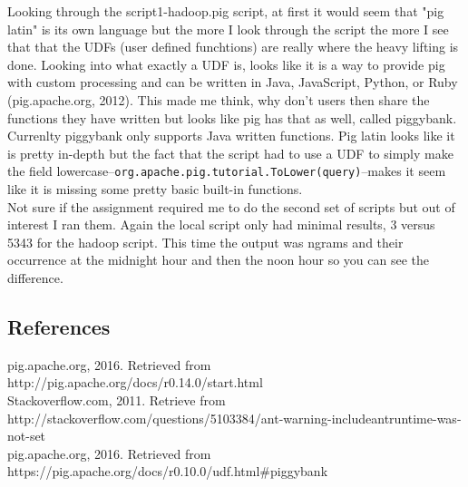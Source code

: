 \documentclass[10pt]{article}
\begin{document}
\indent Looking through the script1-hadoop.pig script, at first it would seem that "pig latin" is its own language but the more I look through the script the more I see that that the UDFs (user defined funchtions) are really where the heavy lifting is done. Looking into what exactly a UDF is, looks like it is a way to provide pig with custom processing and can be written in Java, JavaScript, Python, or Ruby (pig.apache.org, 2012). This made me think, why don't users then share the functions they have written but looks like pig has that as well, called piggybank. Currenlty piggybank only supports Java written functions. Pig latin looks like it is pretty in-depth but the fact that the script had to use a UDF to simply make the field lowercase--\verb|org.apache.pig.tutorial.ToLower(query)|--makes it seem like it is missing some pretty basic built-in functions. \\
\indent Not sure if the assignment required me to do the second set of scripts but out of interest I ran them. Again the local script only had minimal results, 3 versus 5343 for the hadoop script. This time the output was ngrams and their occurrence at the midnight hour and then the noon hour so you can see the difference. 
\par
{}%
\hfill
{}%
\par
\subsection*{References}
pig.apache.org, 2016. Retrieved from http://pig.apache.org/docs/r0.14.0/start.html\\
Stackoverflow.com, 2011. Retrieve from http://stackoverflow.com/questions/5103384/ant-warning-includeantruntime-was-not-set\\
pig.apache.org, 2016. Retrieved from https://pig.apache.org/docs/r0.10.0/udf.html\#piggybank
\end{document}

